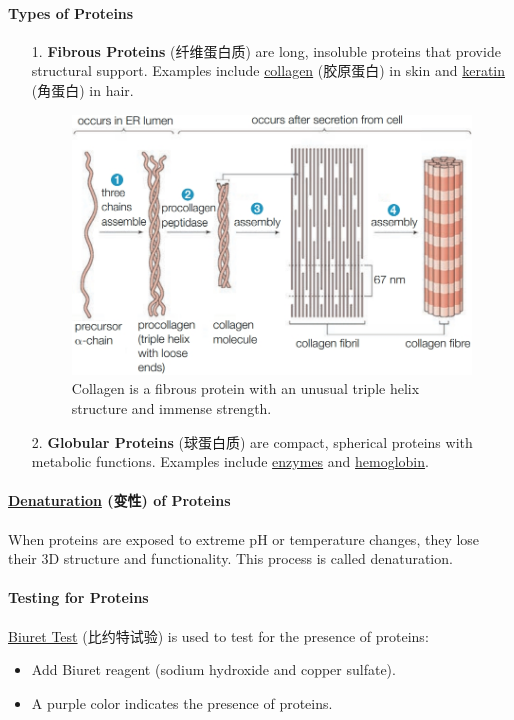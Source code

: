 \paragraph{Types of Proteins}
\begin{itemize}
    \item[1.] \textbf{Fibrous Proteins} (纤维蛋白质) are long, insoluble proteins that provide structural support. Examples include
    \underline{collagen} (胶原蛋白) in skin and \underline{keratin} (角蛋白) in hair.
    \begin{figure}[H]
        \centering
        \includegraphics[scale=0.3]{Biology/1A/Images/1A-5-5.png}
        \caption{Collagen is a fibrous protein with an unusual triple helix structure and immense strength.}
    \end{figure}
    \item[2.] \textbf{Globular Proteins} (球蛋白质) are compact, spherical proteins with metabolic functions. Examples include
    \underline{enzymes} and \underline{hemoglobin}.
\end{itemize}

\paragraph{\underline{Denaturation} (变性) of Proteins}
When proteins are exposed to extreme pH or temperature changes, they lose their 3D structure and functionality. This process is
called denaturation.

\paragraph{Testing for Proteins}
\underline{Biuret Test} (比约特试验) is used to test for the presence of proteins:
\begin{itemize}
    \item Add Biuret reagent (sodium hydroxide and copper sulfate).
    \item A purple color indicates the presence of proteins.
\end{itemize}